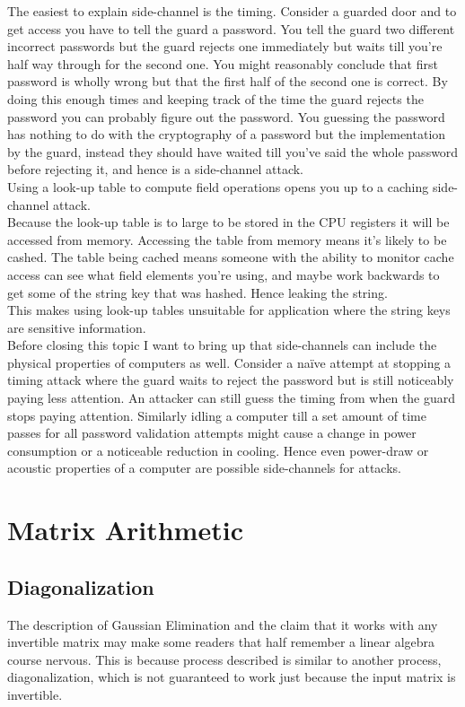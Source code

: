 The easiest to explain side-channel is the timing.
Consider a guarded door and to get access you have to tell the guard a password.
You tell the guard two different incorrect passwords but the guard rejects one immediately but waits till you're half way through for the second one.
You might reasonably conclude that first password is wholly wrong but that the first half of the second one is correct.
By doing this enough times and keeping track of the time the guard rejects the password you can probably figure out the password.
You guessing the password has nothing to do with the cryptography of a password but the implementation by the guard,
instead they should have waited till you've said the whole password before rejecting it, 
and hence is a side-channel attack.
\\

Using a look-up table to compute field operations opens you up to a caching side-channel attack.
\\

Because the look-up table is to large to be stored in the CPU registers it will be accessed from memory.
Accessing the table from memory means it's likely to be cashed.
The table being cached means someone with the ability to monitor cache access can see what field elements you're using,
and maybe work backwards to get some of the string key that was hashed.
Hence leaking the string.
\\

This makes using look-up tables unsuitable for application where the string keys are sensitive information.
\\

Before closing this topic I want to bring up that side-channels can include the physical properties of computers as well.
Consider a naïve attempt at stopping a timing attack where the guard waits to reject the password but is still noticeably paying less attention.
An attacker can still guess the timing from when the guard stops paying attention.
Similarly idling a computer till a set amount of time passes for all password validation attempts might cause a change in power consumption or a noticeable reduction in cooling. 
Hence even power-draw or acoustic properties of a computer are possible side-channels for attacks.

\section{Matrix Arithmetic}
\subsection{Diagonalization}
The description of Gaussian Elimination and the claim that it works with any invertible matrix may make some readers that half remember a linear algebra course nervous.
This is because process described is similar to another process, diagonalization, which is not guaranteed to work just because the input matrix is invertible.
\\

